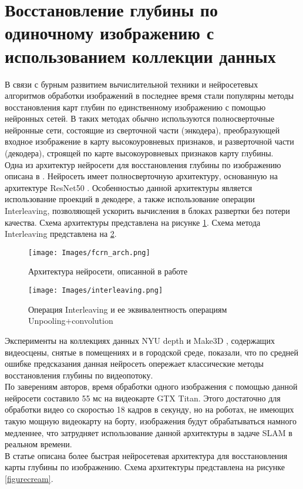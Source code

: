 \documentclass{mipt-thesis-bs}
\begin{document}
\section{Восстановление глубины по одиночному изображению с использованием коллекции данных}
В связи с бурным развитием вычислительной техники и нейросетевых алгоритмов обработки изображений в последнее время стали популярны методы восстановления карт глубин по единственному изображению с помощью нейронных сетей. В таких методах обычно используются полносверточные нейронные сети, состоящие из сверточной части (энкодера), преобразующей входное изображение в карту высокоуровневых признаков, и разверточной части (декодера), строящей по карте высокоуровневых признаков карту глубины.\\
Одна из архитектур нейросети для восстановления глубины по изображению описана в \cite{laina2016deeper}. Нейросеть имеет полносверточную архитектуру, основанную на архитектуре ResNet50 \cite{he2016deep}. Особенностью данной архитектуры является использование проекций в декодере, а также использование операции Interleaving, позволяющей ускорить вычисления в блоках развертки без потери качества. Схема архитектуры представлена на рисунке \ref{figurefcrn}. Схема метода Interleaving представлена на \ref{figureinterleaving}.

\begin{figure}
	\centering
	\texttt{[image: Images/fcrn\_arch.png]}
	\caption{Архитектура нейросети, описанной в работе \cite{laina2016deeper}}
	\label{figurefcrn}
\end{figure}

\begin{figure}
	\centering
	\texttt{[image: Images/interleaving.png]}\\
	\caption{Операция Interleaving и ее эквивалентность операциям Unpooling+convolution}
	\label{figureinterleaving}
\end{figure}

Эксперименты на коллекциях данных NYU depth \cite{silberman2011indoor} и Make3D \cite{ashutosh2009make3d}, содержащих видеосцены, снятые в помещениях и в городской среде, показали, что по средней ошибке предсказания данная нейросеть опережает классические методы восстановления глубины по видеопотоку.\\
По заверениям авторов, время обработки одного изображения с помощью данной нейросети составило 55 мс на видеокарте GTX Titan. Этого достаточно для обработки видео со скоростью 18 кадров в секунду, но на роботах, не имеющих такую мощную видеокарту на борту, изображения будут обрабатываться намного медленнее, что затрудняет использование данной архитектуры в задаче SLAM в реальном времени.\\
В статье \cite{spek2018cream} описана более быстрая нейросетевая архитектура для восстановления карты глубины по изображению. Схема архитектуры представлена на рисунке \ref{figurecream}.\\
\end{document}
